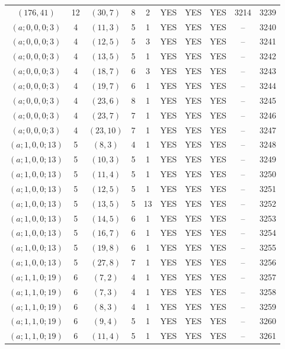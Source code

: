 \begin{longtable}{|c|c|c|c|c|c|c|c|c|c|}
$(176, 41)$ & 12 & $(30, 7)$ & 8 & 2 & YES & YES & YES & 3214 & 3239\\
$(a; 0, 0, 0; 3)$ & 4 & $(11, 3)$ & 5 & 1 & YES & YES & YES & -- & 3240\\
$(a; 0, 0, 0; 3)$ & 4 & $(12, 5)$ & 5 & 3 & YES & YES & YES & -- & 3241\\
$(a; 0, 0, 0; 3)$ & 4 & $(13, 5)$ & 5 & 1 & YES & YES & YES & -- & 3242\\
$(a; 0, 0, 0; 3)$ & 4 & $(18, 7)$ & 6 & 3 & YES & YES & YES & -- & 3243\\
$(a; 0, 0, 0; 3)$ & 4 & $(19, 7)$ & 6 & 1 & YES & YES & YES & -- & 3244\\
$(a; 0, 0, 0; 3)$ & 4 & $(23, 6)$ & 8 & 1 & YES & YES & YES & -- & 3245\\
$(a; 0, 0, 0; 3)$ & 4 & $(23, 7)$ & 7 & 1 & YES & YES & YES & -- & 3246\\
$(a; 0, 0, 0; 3)$ & 4 & $(23, 10)$ & 7 & 1 & YES & YES & YES & -- & 3247\\
$(a; 1, 0, 0; 13)$ & 5 & $(8, 3)$ & 4 & 1 & YES & YES & YES & -- & 3248\\
$(a; 1, 0, 0; 13)$ & 5 & $(10, 3)$ & 5 & 1 & YES & YES & YES & -- & 3249\\
$(a; 1, 0, 0; 13)$ & 5 & $(11, 4)$ & 5 & 1 & YES & YES & YES & -- & 3250\\
$(a; 1, 0, 0; 13)$ & 5 & $(12, 5)$ & 5 & 1 & YES & YES & YES & -- & 3251\\
$(a; 1, 0, 0; 13)$ & 5 & $(13, 5)$ & 5 & 13 & YES & YES & YES & -- & 3252\\
$(a; 1, 0, 0; 13)$ & 5 & $(14, 5)$ & 6 & 1 & YES & YES & YES & -- & 3253\\
$(a; 1, 0, 0; 13)$ & 5 & $(16, 7)$ & 6 & 1 & YES & YES & YES & -- & 3254\\
$(a; 1, 0, 0; 13)$ & 5 & $(19, 8)$ & 6 & 1 & YES & YES & YES & -- & 3255\\
$(a; 1, 0, 0; 13)$ & 5 & $(27, 8)$ & 7 & 1 & YES & YES & YES & -- & 3256\\
$(a; 1, 1, 0; 19)$ & 6 & $(7, 2)$ & 4 & 1 & YES & YES & YES & -- & 3257\\
$(a; 1, 1, 0; 19)$ & 6 & $(7, 3)$ & 4 & 1 & YES & YES & YES & -- & 3258\\
$(a; 1, 1, 0; 19)$ & 6 & $(8, 3)$ & 4 & 1 & YES & YES & YES & -- & 3259\\
$(a; 1, 1, 0; 19)$ & 6 & $(9, 4)$ & 5 & 1 & YES & YES & YES & -- & 3260\\
$(a; 1, 1, 0; 19)$ & 6 & $(11, 4)$ & 5 & 1 & YES & YES & YES & -- & 3261\\

\end{longtable}
